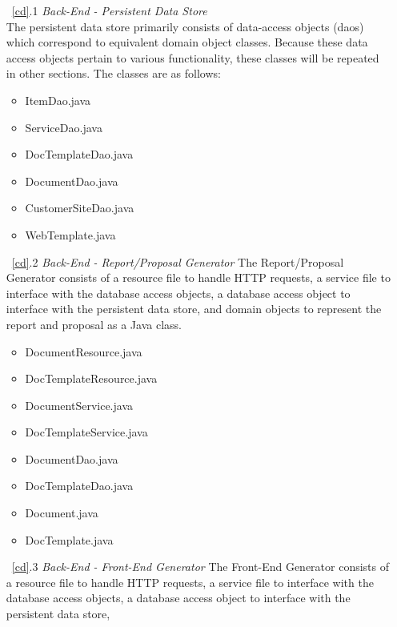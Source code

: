\documentclass{article}
\newcommand{\br}{\vspace{2mm}}
\begin{document}
\begin{enumerate}
    \item[~\ref{cd}.1 ] \emph{Back-End - Persistent Data Store}\br\\
        The persistent data store primarily consists of data-access objects (daos)
        which correspond to equivalent domain object classes.  Because these data
        access objects pertain to various functionality, these classes will be
        repeated in other sections.  The classes are as follows:
        \begin{itemize}
            \item ItemDao.java
            \item ServiceDao.java
            \item DocTemplateDao.java
            \item DocumentDao.java
            \item CustomerSiteDao.java
            \item WebTemplate.java
        \end{itemize}
    \item[~\ref{cd}.2 ] \emph{Back-End - Report/Proposal Generator}
        The Report/Proposal Generator consists of a resource file to handle HTTP
        requests, a service file to interface with the database access objects,
        a database access object to interface with the persistent data store,
        and domain objects to represent the report and proposal as a Java class.
        \begin{itemize}
            \item DocumentResource.java
            \item DocTemplateResource.java
            \item DocumentService.java
            \item DocTemplateService.java
            \item DocumentDao.java
            \item DocTemplateDao.java
            \item Document.java
            \item DocTemplate.java
        \end{itemize}
    \item[~\ref{cd}.3 ] \emph{Back-End - Front-End Generator}
        The Front-End Generator consists of a resource file to handle HTTP requests,
        a service file to interface with the database access objects, a database
        access object to interface with the persistent data store,

\end{enumerate}
\end{document}
